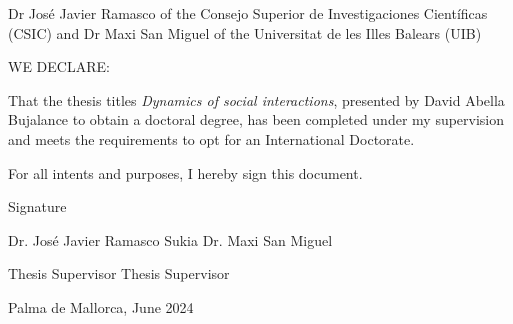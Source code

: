 \thispagestyle{empty}

Dr Jos\'e Javier Ramasco of the Consejo Superior de Investigaciones Cient\'ificas (CSIC) and Dr Maxi San Miguel of the Universitat de les Illes Balears (UIB)

\vspace*{2 cm}

WE DECLARE:

\vspace*{1 cm}

That the thesis titles \textit{Dynamics of social interactions}, presented by David Abella Bujalance to obtain a doctoral degree, has been completed under my supervision and meets the requirements to opt for an International Doctorate.

\vspace*{2 cm}

For all intents and purposes, I hereby sign this document.

\vspace*{2 cm}

Signature

\vspace*{3 cm}

      Dr. Jos\'e Javier Ramasco Sukia              \hfill Dr. Maxi San Miguel


\vspace*{0.1 cm}

        Thesis Supervisor              \hfill Thesis Supervisor

\vspace*{1 cm}

        Palma de Mallorca, June 2024

\vfill